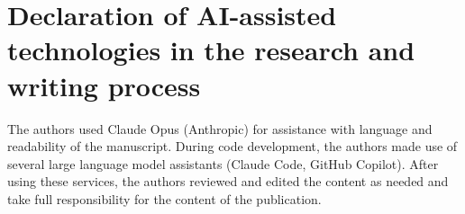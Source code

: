 \section*{Declaration of AI-assisted technologies in the research and writing process}

The authors used Claude Opus (Anthropic) for assistance with language and readability of the manuscript. During code development, the authors made use of several large language model assistants (Claude Code, GitHub Copilot). After using these services, the authors reviewed and edited the content as needed and take full responsibility for the content of the publication.
